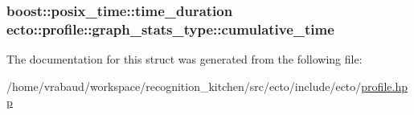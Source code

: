 \subsubsection[{\texorpdfstring{cumulative\+\_\+time}{cumulative_time}}]{\setlength{\rightskip}{0pt plus 5cm}boost\+::posix\+\_\+time\+::time\+\_\+duration ecto\+::profile\+::graph\+\_\+stats\+\_\+type\+::cumulative\+\_\+time}\hypertarget{structecto_1_1profile_1_1graph__stats__type_a340d79ae72ca5639e55098c860640ba8}{}\label{structecto_1_1profile_1_1graph__stats__type_a340d79ae72ca5639e55098c860640ba8}


The documentation for this struct was generated from the following file\+:\begin{DoxyCompactItemize}
\item 
/home/vrabaud/workspace/recognition\+\_\+kitchen/src/ecto/include/ecto/\hyperlink{profile_8hpp}{profile.\+hpp}\end{DoxyCompactItemize}

